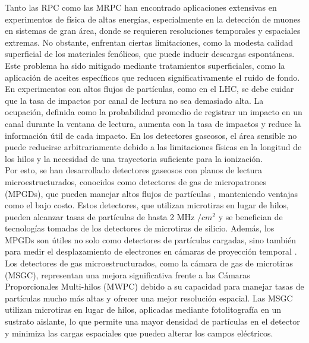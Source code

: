 \documentclass{article}
\begin{document}
\noindent Tanto las RPC como las MRPC han encontrado aplicaciones extensivas en experimentos de física de altas energías, especialmente en la detección de muones en sistemas de gran área, donde se requieren resoluciones temporales y espaciales extremas. No obstante, enfrentan ciertas limitaciones, como la modesta calidad superficial de los materiales fenólicos, que puede inducir descargas espontáneas. Este problema ha sido mitigado mediante tratamientos superficiales, como la aplicación de aceites específicos que reducen significativamente el ruido de fondo. \\

\noindent En experimentos con altos flujos de partículas, como en el LHC, se debe cuidar que la tasa de impactos por canal de lectura no sea demasiado alta. La ocupación, definida como la probabilidad promedio de registrar un impacto en un canal durante la ventana de lectura, aumenta con la tasa de impactos y reduce la información útil de cada impacto. En los detectores gaseosos, el área sensible no puede reducirse arbitrariamente debido a las limitaciones físicas en la longitud de los hilos y la necesidad de una trayectoria suficiente para la ionización.\\

\noindent Por esto, se han desarrollado detectores gaseosos con planos de lectura microestructurados, conocidos como detectores de gas de micropatrones (MPGDs), que pueden manejar altos flujos de partículas \cite{oed1988position}, manteniendo ventajas como el bajo costo. Estos detectores, que utilizan microtiras en lugar de hilos, pueden alcanzar tasas de partículas de hasta 2 MHz $/cm^{2}$ y se benefician de tecnologías tomadas de los detectores de microtiras de silicio. Además, los MPGDs son útiles no solo como detectores de partículas cargadas, sino también para medir el desplazamiento de electrones en cámaras de proyección temporal \cite{giomataris1996micromegas}.\\

\noindent Los detectores de gas microestructurados, como la cámara de gas de microtiras (MSGC), representan una mejora significativa frente a las Cámaras Proporcionales Multi-hilos (MWPC) debido a su capacidad para manejar tasas de partículas mucho más altas y ofrecer una mejor resolución espacial. Las MSGC utilizan microtiras en lugar de hilos, aplicadas mediante fotolitografía en un sustrato aislante, lo que permite una mayor densidad de partículas en el detector y minimiza las cargas espaciales que pueden alterar los campos eléctricos.\\
\end{document}
